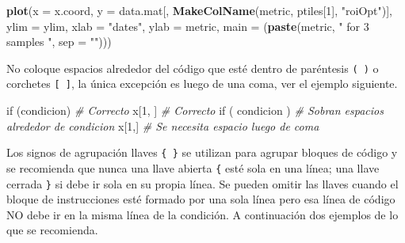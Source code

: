 \documentclass[10pt,]{krantz}
\makeatletter
\newenvironment{Shaded}{\begin{snugshade}}{\end{snugshade}}
\newcommand{\KeywordTok}[1]{\textcolor[rgb]{0.13,0.29,0.53}{\textbf{{#1}}}}
\newcommand{\DataTypeTok}[1]{\textcolor[rgb]{0.13,0.29,0.53}{{#1}}}
\newcommand{\DecValTok}[1]{\textcolor[rgb]{0.00,0.00,0.81}{{#1}}}
\newcommand{\StringTok}[1]{\textcolor[rgb]{0.31,0.60,0.02}{{#1}}}
\newcommand{\CommentTok}[1]{\textcolor[rgb]{0.56,0.35,0.01}{\textit{{#1}}}}
\newcommand{\NormalTok}[1]{{#1}}
\newenvironment{kframe}{%
\medskip{}
\setlength{\fboxsep}{.8em}
 \def\at@end@of@kframe{}%
 \ifinner\ifhmode%
  \def\at@end@of@kframe{\end{minipage}}%
  \begin{minipage}{\columnwidth}%
 \fi\fi%
 \def\FrameCommand##1{\hskip\@totalleftmargin \hskip-\fboxsep
 \colorbox{shadecolor}{##1}\hskip-\fboxsep
     \hskip-\linewidth \hskip-\@totalleftmargin \hskip\columnwidth}%
 \MakeFramed {\advance\hsize-\width
   \@totalleftmargin\z@ \linewidth\hsize
   \@setminipage}}%
 {\par\unskip\endMakeFramed%
 \at@end@of@kframe}
\renewenvironment{Shaded}{\begin{kframe}}{\end{kframe}}
\makeatother
\begin{document}
\begin{Shaded}
\begin{Highlighting}[]
\KeywordTok{plot}\NormalTok{(}\DataTypeTok{x    =} \NormalTok{x.coord,}
     \DataTypeTok{y    =} \NormalTok{data.mat[, }\KeywordTok{MakeColName}\NormalTok{(metric, ptiles[}\DecValTok{1}\NormalTok{], }\StringTok{"roiOpt"}\NormalTok{)],}
     \DataTypeTok{ylim =} \NormalTok{ylim,}
     \DataTypeTok{xlab =} \StringTok{"dates"}\NormalTok{,}
     \DataTypeTok{ylab =} \NormalTok{metric,}
     \DataTypeTok{main =} \NormalTok{(}\KeywordTok{paste}\NormalTok{(metric, }\StringTok{" for 3 samples "}\NormalTok{, }\DataTypeTok{sep =} \StringTok{""}\NormalTok{)))}
\end{Highlighting}
\end{Shaded}

No coloque espacios alrededor del código que esté dentro de paréntesis
\texttt{(\ )} o corchetes \texttt{{[}\ {]}}, la única excepción es luego
de una coma, ver el ejemplo siguiente.

\begin{Shaded}
\begin{Highlighting}[]
\NormalTok{if (condicion)    }\CommentTok{# Correcto }
\NormalTok{x[}\DecValTok{1}\NormalTok{, ]            }\CommentTok{# Correcto}
\NormalTok{if ( condicion )  }\CommentTok{# Sobran espacios alrededor de condicion}
\NormalTok{x[}\DecValTok{1}\NormalTok{,]             }\CommentTok{# Se necesita espacio luego de coma}
\end{Highlighting}
\end{Shaded}

Los signos de agrupación llaves \texttt{\{\ \}} se utilizan para agrupar
bloques de código y se recomienda que nunca una llave abierta
\texttt{\{} esté sola en una línea; una llave cerrada \texttt{\}} si
debe ir sola en su propia línea. Se pueden omitir las llaves cuando el
bloque de instrucciones esté formado por una sola línea pero esa línea
de código NO debe ir en la misma línea de la condición. A continuación
dos ejemplos de lo que se recomienda.
\end{document}
